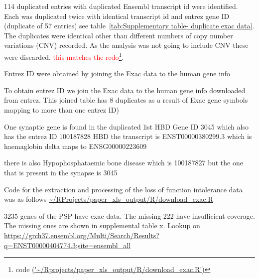 
114 duplicated entries with duplicated Ensembl transcript id were identified. Each was duplicated twice with identical transcript id and entrez gene ID (duplicate of 57 entries) see table~\ref{tab:Supplementary table- duplicate exac data}. The duplicates were identical other than different numbers of copy number variations (CNV) recorded. As the analysis was not going to include CNV these were discarded.  \textcolor{red}{this matches the redo}\footnote{code \url{('~/Rprojects/paper_xls_output/R/download_exac.R')}}.


Entrez ID were obtained by joining the Exac data to the human gene info 




To obtain entrez ID we join the Exac data to the human gene info downloaded from entrez. This joined table has 8 duplicates as a result of Exac gene symbols mapping to more than one entrez ID)

One synaptic gene is found in the duplicated list HBD Gene ID 3045 which also has the entrez ID 100187828 
HBD
the transcript is ENST00000380299.3 which is haemaglobin delta maps to ENSG00000223609

there is also Hypophosphataemic bone disease which is 100187827 but the one that is present in the synapse is 3045


Code for the extraction and processing of the loss of function intolerance data was as follows 
\url{~/RProjects/paper_xls_output/R/download_exac.R}

3235 genes of the PSP have exac data. The missing 222 have insufficient coverage. The missing ones are shown in supplemental table x.
Lookup on \url{https://grch37.ensembl.org/Multi/Search/Results?q=ENST00000404774.3;site=ensembl_all}

